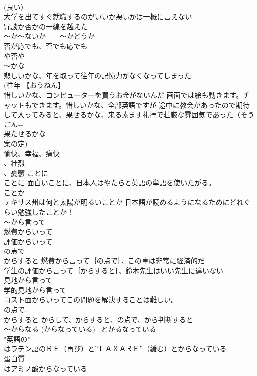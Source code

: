 \documentclass[8pt]{extreport}
\begin{document}
\begin{CJK}{UTF8}{min}
\\	(良い） 
\\	大学を出てすぐ就職するのがいいか悪いかは一概に言えない 
\\	冗談か否かの一線を越えた 
\\	～か～ないか　　～かどうか 
\\	否が応でも、否でも応でも 
\\	や否や 
\\	～かな	
\\	悲しいかな、年を取って往年の記憶力がなくなってしまった
\\	(往年 【おうねん】 
\\	惜しいかな、コンピューターを買うお金がないんだ 画面では絵も動きます。チャットもできます。惜しいかな、全部英語ですが 途中に教会があったので期待して入ってみると、果せるかな、来る素ます礼拝で荘厳な雰囲気であった（そうごん=
\\	果たせるかな
\\	案の定) 
\\	愉快、幸福、痛快
\\	、壮烈
\\	、憂鬱 ことに 
\\	ことに 面白いことに、日本人はやたらと英語の単語を使いたがる。 
\\	ことか 
\\	テキサス州は何と太陽が明るいことか 日本語が読めるようになるためにどれぐらい勉強したことか！
\\	～から言って 
\\	燃費からいって 
\\	評価からいって	
\\	の点で 
\\	からすると	燃費から言って｛の点で｝、この車は非常に経済的だ 
\\	学生の評価から言って｛からすると｝、鈴木先生はいい先生に違いない 
\\	見地から言って 
\\	学的見地から言って 
\\	コスト面からいってこの問題を解決することは難しい。 
\\	の点で. 
\\	からすると	からして、からすると、の点で、から判断すると
\\	～からなる (からなっている) ~とかるなっている	
\\	"英語の”
\\	はラテン語のＲＥ（再び）と”ＬＡＸＡＲＥ”（緩む）とからなっている 
\\	蛋白質
\\	はアミノ酸からなっている 

\end{CJK}
\end{document}
